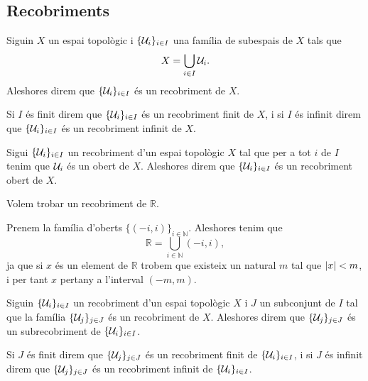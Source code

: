\documentclass[../Apunts.tex]{subfiles}
\begin{document}
	\subsection{Recobriments}
	\begin{definition}[Recobriment]
		\label{def:recobriment d'un espai}
		\label{def:recobriment finit d'un espai}
		\label{def:recobriment infinit d'un espai}
		Siguin \(X\) un espai topològic i \(\{\mathcal{U}_{i}\}_{i\in I}\) una família de subespais de \(X\) tals que
		\[X=\bigcup_{i\in I}\mathcal{U}_{i}.\]
		Aleshores direm que \(\{\mathcal{U}_{i}\}_{i\in I}\) és un recobriment de \(X\).
		
		Si \(I\) és finit direm que \(\{\mathcal{U}_{i}\}_{i\in I}\) és un recobriment finit de \(X\), i si \(I\) és infinit direm que \(\{\mathcal{U}_{i}\}_{i\in I}\) és un recobriment infinit de \(X\).
	\end{definition}
	\begin{definition}
		\label{def:recobriment obert}
		Sigui \(\{\mathcal{U}_{i}\}_{i\in I}\) un recobriment d'un espai topològic \(X\) tal que per a tot \(i\) de \(I\) tenim que \(\mathcal{U}_{i}\) és un obert de \(X\). Aleshores direm que \(\{\mathcal{U}_{i}\}_{i\in I}\) és un recobriment obert de \(X\).
	\end{definition}
	\begin{example}
		\label{ex:un recobriment obert de R}
		Volem trobar un recobriment de \(\mathbb{R}\).
		\begin{solution}
			Prenem la família d'oberts \(\{(-i,i)\}_{i\in\mathbb{N}}\). Aleshores tenim que
			\[\mathbb{R}=\bigcup_{i\in\mathbb{N}}(-i,i),\]
			ja que si \(x\) és un element de \(\mathbb{R}\) trobem que existeix un natural \(m\) tal que \(\abs{x}<m\), i per tant \(x\) pertany a l'interval \((-m,m)\).
		\end{solution}
	\end{example}
	\begin{definition}[Subrecobriment]
		\label{def:subrecobriment}
		\label{def:subrecobriment finit}
		\label{def:subrecobriment infinit}
		Siguin \(\{\mathcal{U}_{i}\}_{i\in I}\) un recobriment d'un espai topològic \(X\) i \(J\) un subconjunt de \(I\) tal que la família \(\{\mathcal{U}_{j}\}_{j\in J}\) és un recobriment de \(X\). Aleshores direm que \(\{\mathcal{U}_{j}\}_{j\in J}\) és un subrecobriment de \(\{\mathcal{U}_{i}\}_{i\in I}\).
		
		Si \(J\) és finit direm que \(\{\mathcal{U}_{j}\}_{j\in J}\) és un recobriment finit de \(\{\mathcal{U}_{i}\}_{i\in I}\), i si \(J\) és infinit direm que \(\{\mathcal{U}_{j}\}_{j\in J}\) és un recobriment infinit de \(\{\mathcal{U}_{i}\}_{i\in I}\).
	\end{definition}
\end{document}
